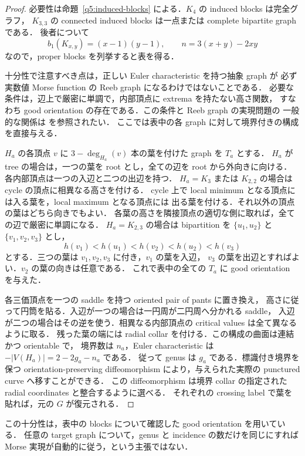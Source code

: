 \begin{proof}
必要性は命題~\ref{q5:induced-blocks} による．$K_4$ の induced blocks は完全グラフ，
$K_{3,3}$ の connected induced blocks は一点または complete bipartite graph である．
後者について
\[
 b_1(K_{x,y})=(x-1)(y-1),\qquad n=3(x+y)-2xy
\]
なので，proper blocks を列挙すると表を得る．

十分性で注意すべき点は，正しい Euler characteristic を持つ抽象 graph が
必ず実数値 Morse function の Reeb graph になるわけではないことである．
必要な条件は，辺上で厳密に単調で，内部頂点に extrema を持たない高さ関数，
すなわち good orientation の存在である．この条件と Reeb graph の実現問題の
一般的な関係は \cite[Definition 2.2 and Theorem 5.6]{MichalakReeb} を参照されたい．
ここでは表中の各 graph に対して境界付きの構成を直接与える．

$H_a$ の各頂点 $v$ に $3-\deg_{H_a}(v)$ 本の葉を付けた graph を $T_a$ とする．
$H_a$ が tree の場合は，一つの葉を root とし，全ての辺を root から外向きに向ける．
各内部頂点は一つの入辺と二つの出辺を持つ．
$H_a=K_3$ または $K_{2,2}$ の場合は cycle の頂点に相異なる高さを付ける．
cycle 上で local minimum となる頂点には入る葉を，local maximum となる頂点には
出る葉を付ける．それ以外の頂点の葉はどちら向きでもよい．
各葉の高さを隣接頂点の適切な側に取れば，全ての辺で厳密に単調になる．
$H_a=K_{2,3}$ の場合は bipartition を $\{u_1,u_2\}$ と
$\{v_1,v_2,v_3\}$ とし，
\[
 h(v_1)<h(u_1)<h(v_2)<h(u_2)<h(v_3)
\]
とする．三つの葉は $v_1,v_2,v_3$ に付き，$v_1$ の葉を入辺，
$v_3$ の葉を出辺とすればよい．$v_2$ の葉の向きは任意である．
これで表中の全ての $T_a$ に good orientation を与えた．

各三価頂点を一つの saddle を持つ oriented pair of pants に置き換え，
高さに従って円筒を貼る．入辺が一つの場合は一円周が二円周へ分かれる saddle，
入辺が二つの場合はその逆を使う．相異なる内部頂点の critical values は全て異なるように取る．
残った葉の端には radial collar を付ける．この構成の曲面は連結かつ orientable で，
境界数は $n_a$，Euler characteristic は $-|V(H_a)|=2-2g_a-n_a$ である．
従って genus は $g_a$ である．標識付き境界を保つ orientation-preserving
diffeomorphism により，与えられた実際の punctured curve へ移すことができる．
この diffeomorphism は境界 collar の指定された radial coordinates と整合するように選べる．
それぞれの crossing label で葉を貼れば，元の $G$ が復元される．
\end{proof}

この十分性は，表中の blocks について確認した good orientation を用いている．
任意の target graph について，genus と incidence の数だけを同じにすれば
Morse 実現が自動的に従う，という主張ではない．

